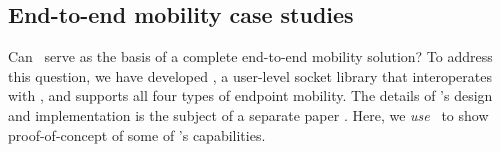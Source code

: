 



\subsection{End-to-end mobility case studies}
\label{sec:e2e}



Can \auspice\ serve as the basis of a complete end-to-end mobility solution? To address this question, we have developed \msocket, a user-level socket library that interoperates with \auspice, and supports all four types of endpoint mobility. %
The details of \msocket's design and implementation is the subject of a separate paper \cite{msocketTR}. Here, we {\em use} \msocket\ to show proof-of-concept of some of \auspice's capabilities.









